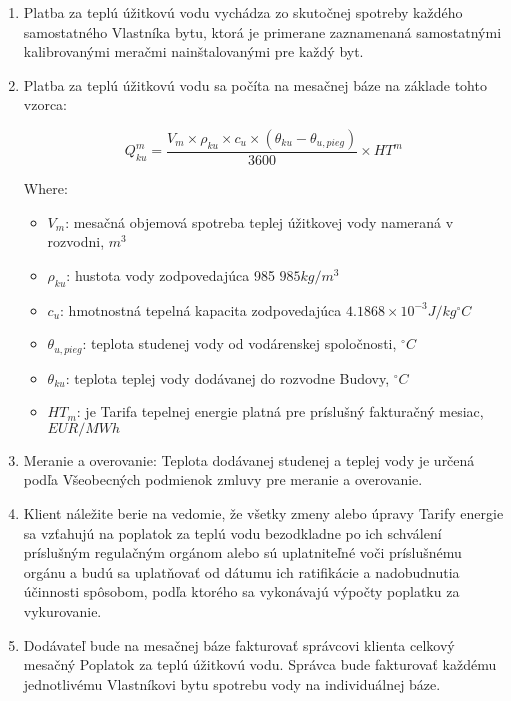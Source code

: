 \begin{enumerate}
	\item Platba za teplú úžitkovú vodu vychádza zo skutočnej spotreby každého samostatného Vlastníka bytu, ktorá je primerane zaznamenaná samostatnými kalibrovanými meračmi nainštalovanými pre každý byt. 
	\item Platba za teplú úžitkovú vodu sa počíta na mesačnej báze na základe tohto vzorca:

\[ Q^{m}_{ku} = \frac{V_m \times \rho_{ku} \times c_u \times \left(\theta_{ku} - \theta_{u,pieg}\right)}{3600} \times HT^m \]

Where:

\begin{itemize}
	\item $V_m$: mesačná objemová spotreba teplej úžitkovej vody nameraná v rozvodni,  $m^3$
	\item $\rho_{ku}$: hustota vody zodpovedajúca 985 $985 kg/m^3$
	\item $c_u$: hmotnostná tepelná kapacita zodpovedajúca  $4.1868 \times 10^{-3} J/kg^\circ C$
	\item $\theta_{u,pieg}$: teplota studenej vody od vodárenskej spoločnosti,  $^\circ C$
	\item $\theta_{ku}$: teplota teplej vody dodávanej do rozvodne Budovy, $^\circ C$
	\item $HT_m$: je Tarifa tepelnej energie platná pre príslušný fakturačný mesiac, $EUR/MWh$
\end{itemize}

	\item Meranie a overovanie: Teplota dodávanej studenej a teplej vody je určená podľa Všeobecných podmienok zmluvy pre meranie a overovanie.
	\item Klient náležite berie na vedomie, že všetky zmeny alebo úpravy Tarify energie sa vzťahujú na poplatok za teplú vodu bezodkladne po ich schválení príslušným regulačným orgánom alebo sú uplatniteľné voči príslušnému orgánu a budú sa uplatňovať od dátumu ich ratifikácie a nadobudnutia účinnosti spôsobom, podľa ktorého sa vykonávajú výpočty poplatku za vykurovanie.
	\item Dodávateľ bude na mesačnej báze fakturovať správcovi klienta celkový mesačný Poplatok za teplú úžitkovú vodu. Správca bude fakturovať každému jednotlivému Vlastníkovi bytu spotrebu vody na individuálnej báze.

\end{enumerate}
